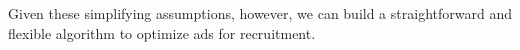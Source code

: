 \documentclass[letterpaper,12pt]{article}
\theoremstyle{proposition}
\begin{document}

Given these simplifying assumptions, however, we can build a straightforward and flexible algorithm to optimize ads for recruitment.

\end{document}
